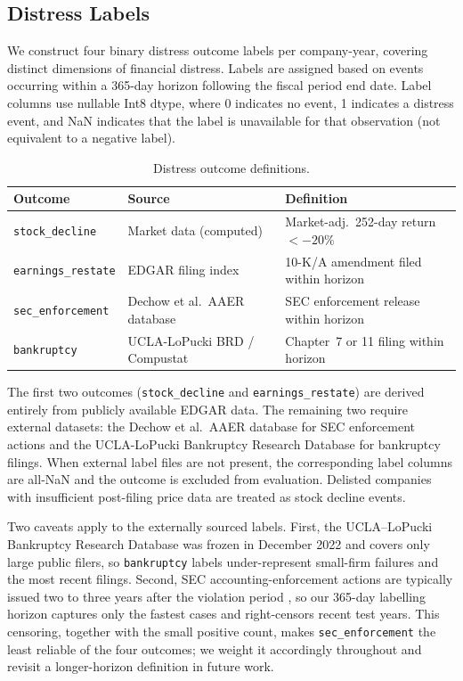 \subsection{Distress Labels}
\label{sec:labels}

We construct four binary distress outcome labels per company-year, covering distinct dimensions of financial distress. Labels are assigned based on events occurring within a 365-day horizon following the fiscal period end date. Label columns use nullable Int8 dtype, where 0 indicates no event, 1 indicates a distress event, and NaN indicates that the label is unavailable for that observation (not equivalent to a negative label).

\begin{table}[ht]
  \centering
  \caption{Distress outcome definitions.}
  \label{tab:labels}
  \small
  \begin{tabular}{@{}lll@{}}
    \toprule
    Outcome & Source & Definition \\
    \midrule
    \texttt{stock\_decline} & Market data (computed) & Market-adj.\ 252-day return $< -20\%$ \\
    \texttt{earnings\_restate} & EDGAR filing index & 10-K/A amendment filed within horizon \\
    \texttt{sec\_enforcement} & Dechow et al.\ AAER database & SEC enforcement release within horizon \\
    \texttt{bankruptcy} & UCLA-LoPucki BRD / Compustat & Chapter~7 or 11 filing within horizon \\
    \bottomrule
  \end{tabular}
\end{table}

The first two outcomes (\texttt{stock\_decline} and \texttt{earnings\_restate}) are derived entirely from publicly available EDGAR data. The remaining two require external datasets: the Dechow et al.\ AAER database for SEC enforcement actions and the UCLA-LoPucki Bankruptcy Research Database for bankruptcy filings. When external label files are not present, the corresponding label columns are all-NaN and the outcome is excluded from evaluation. Delisted companies with insufficient post-filing price data are treated as stock decline events.

Two caveats apply to the externally sourced labels. First, the UCLA--LoPucki Bankruptcy Research Database was frozen in December 2022 and covers only large public filers, so \texttt{bankruptcy} labels under-represent small-firm failures and the most recent filings. Second, SEC accounting-enforcement actions are typically issued two to three years after the violation period \citep{karpoff2017proxies}, so our 365-day labelling horizon captures only the fastest cases and right-censors recent test years. This censoring, together with the small positive count, makes \texttt{sec\_enforcement} the least reliable of the four outcomes; we weight it accordingly throughout and revisit a longer-horizon definition in future work.

